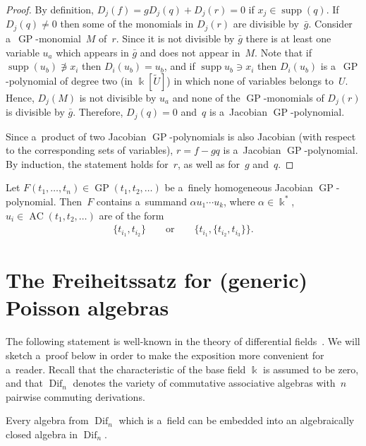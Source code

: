 \documentclass[pdftex]{sigma}
\DeclareMathOperator{\supp}{supp}
\begin{document}
\begin{proof}
By def\/inition, $D_j(f) = gD_j(q) + D_j(r) = 0$ if $x_j \in \supp(q)$.
If $D_j(q) \neq 0$ then some of the monomials in $D_j(r)$ are divisible by~$\bar g$.
Consider a~$\operatorname{GP}$-monomial~$M$ of~$r$.
Since it is not divisible by $\bar g$ there is at least one variable $u_a$ which appears in $\bar g$ and does not appear
in~$M$.
Note that if $\supp(u_b) \not\ni x_i$ then $D_i(u_b) = u_b$, and if $\supp u_b \ni x_i$ then
$D_i(u_b)$ is a~$\operatorname{GP}$-polynomial of degree two (in $\Bbbk[\widetilde U]$) in which none of variables belongs to~$U$.
Hence, $D_j(M)$ is not divisible by $u_a$ and none of the $\operatorname{GP}$-monomials of $D_j(r)$ is divisible by $\bar g$.
Therefore, $D_j(q) = 0$ and~$q$ is a~Jacobian $\operatorname{GP}$-polynomial.

Since a~product of two Jacobian $\operatorname{GP}$-polynomials is also Jacobian (with respect to the corresponding sets of variables),
$r=f-gq$ is a~Jacobian $\operatorname{GP}$-polynomial.
By induction, the statement holds for~$r$, as well as for~$g$ and~$q$.
\end{proof}

\begin{corollary}
\label{cor:2DerLeftJustified}
Let $F(t_1,\dots, t_n) \in \operatorname{GP}(t_1,t_2, \dots)$ be a~finely homogeneous Jacobian $\operatorname{GP}$-poly\-no\-mi\-al.
Then~$F$ contains a~summand $\alpha u_1\cdots u_k$, where $\alpha \in \Bbbk^*$, $u_i\in \operatorname{AC}(t_1,t_2, \dots)$ are of the
form
\begin{gather*}
\{t_{i_1},t_{i_2}\}
\qquad
\text{or}
\qquad
\{t_{i_1},\{t_{i_2},t_{i_3}\}\}.
\end{gather*}
\end{corollary}


\section{The Freiheitssatz for (generic) Poisson algebras}

The following statement is well-known in the theory of dif\/ferential f\/ields~\cite{Kolchin, Ritt}.
We will sketch a~proof below in order to make the exposition more convenient for a~reader.
Recall that the characteristic of the base f\/ield $\Bbbk $ is assumed to be zero, and that $\operatorname{Dif}_n$ denotes the variety of
commutative associative algebras with~$n$ pairwise commuting derivations.

\begin{theorem}
Every algebra from $\operatorname{Dif}_n$ which is a~field can be embedded into an algebraically closed algebra in $\operatorname{Dif}_n$.
\end{theorem}
\end{document}
